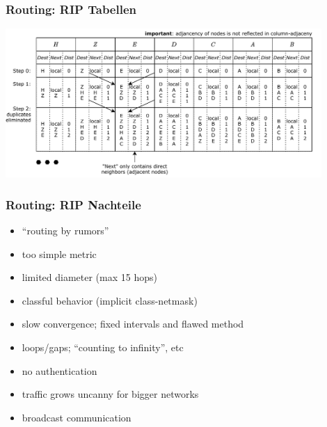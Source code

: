 \documentclass[ignorenonframetext]{beamer}
\begin{document}
\begin{frame}
\frametitle{Routing: RIP Tabellen}
\begin{center}
\includegraphics[width=12cm]{rip-table}
\end{center}

\end{frame}

\begin{frame}
\frametitle{Routing: RIP Nachteile}
\begin{itemize}
	\item ``routing by rumors''
	\item too simple metric
	\item limited diameter (max 15 hops)
	\item classful behavior (implicit class-netmask)
	\item slow convergence; fixed intervals and flawed method
	\item loops/gaps; ``counting to infinity'', etc
	\item no authentication
	\item traffic grows uncanny for bigger networks
	\item broadcast communication
\end{itemize}
\end{frame}
\end{document}
